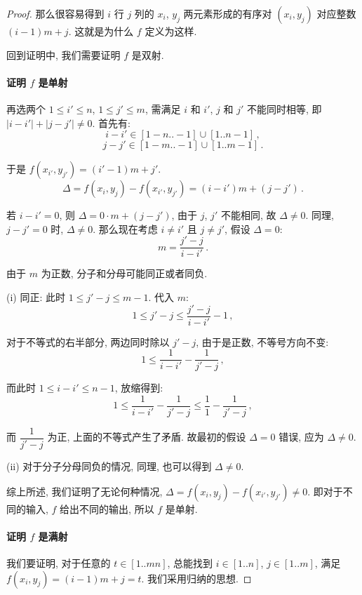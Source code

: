 \documentclass[UTF8]{ctexart}
\theoremstyle{mystyle}
\theoremstyle{myremark}
\theoremstyle{plain}
\begin{document}
\begin{proof}
    那么很容易得到 $ i $ 行 $ j $ 列的 $ x_i $, $ y_j $ 两元素形成的有序对 $ (x_i, y_j) $ 对应整数 $ (i - 1) m + j $. 这就是为什么 $ f $ 定义为这样. 
    
    回到证明中, 我们需要证明 $ f $ 是双射.

    \paragraph{证明 $ f $ 是单射} 
    再选两个 $ 1 \leqslant i' \leqslant n $, $ 1 \leqslant j' \leqslant m $, 需满足 $ i $ 和 $ i' $, $ j $ 和 $ j' $ 不能同时相等, 即 $ |i - i'| + |j - j'| \neq 0 $. 首先有:
    \[ i - i' \in [1 - n .. -1 ] \cup [1 .. n - 1] \,,\]
    \[ j - j' \in [1 - m .. -1 ] \cup [1 .. m - 1] \,.\]
    
    于是 $ f(x_{i'}, y_{j'}) = (i' - 1) m + j' $.
    \[ \Delta = f(x_i, y_j) - f(x_{i'}, y_{j'}) = (i - i') m + (j - j') \,.\] 
    
    若 $ i - i' = 0 $, 则 $ \Delta = 0 \cdot m + (j - j') $, 由于 $ j $, $ j' $ 不能相同, 故 $ \Delta \neq 0 $. 同理, $ j - j' = 0 $ 时, $ \Delta \neq 0 $. 那么现在考虑 $ i \neq i' $ 且 $ j \neq j' $, 假设 $ \Delta = 0 $:
    \[ m = \dfrac{j' - j}{i - i'} \,.\]

    由于 $ m $ 为正数, 分子和分母可能同正或者同负. 
    
    (i) 同正: 此时 $ 1 \leqslant j' - j \leqslant m - 1 $. 代入 $ m $:
    \[ 1 \leqslant j' - j \leqslant \dfrac{j' - j}{i - i'} - 1 \,,\]

    对于不等式的右半部分, 两边同时除以 $ j' - j $, 由于是正数, 不等号方向不变:
    \[ 1 \leqslant \dfrac{1}{i - i'} - \dfrac{1}{j' - j} \,,\]

    而此时 $ 1 \leqslant i - i' \leqslant n - 1 $, 放缩得到:
    \[ 1 \leqslant \dfrac{1}{i - i'} - \dfrac{1}{j' - j} \leqslant \dfrac{1}{1} - \dfrac{1}{j' - j} \,,\]

    而 $ \dfrac{1}{j' - j} $ 为正, 上面的不等式产生了矛盾. 故最初的假设 $ \Delta = 0 $ 错误, 应为 $ \Delta \neq 0 $.

    (ii) 对于分子分母同负的情况, 同理, 也可以得到 $ \Delta \neq 0 $.

    综上所述, 我们证明了无论何种情况, $ \Delta = f(x_i, y_j) - f(x_{i'}, y_{j'}) \neq 0 $. 即对于不同的输入, $ f $ 给出不同的输出, 所以 $ f $ 是单射.

    \paragraph{证明 $ f $ 是满射} 
    我们要证明, 对于任意的 $ t \in [1..mn] $, 总能找到 $ i \in [1..n] $, $ j \in [1..m] $, 满足 $ f(x_i, y_j) = (i - 1) m + j = t $. 我们采用归纳的思想.


\end{proof}
\end{document}
